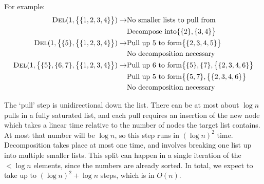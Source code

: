 \documentclass{article}
\begin{document}
\begin{enumerate}
\begin{enumerate}
         For example:
            \begin{equation*}
            \begin{aligned}
                \textsc{Del}(1, \big\{\{1, 2, 3, 4\}\big\}) \rightarrow
                    & \text{No smaller lists to pull from} \\
                    & \text{Decompose into} \{\{2\}, \{3, 4\}\big\} \\
                \textsc{Del}(1, \big\{\{5\}, \big\{\{1, 2, 3, 4\}\big\}) \rightarrow
                    & \text{Pull up 5 to form} \big\{\{2, 3, 4, 5\}\big\} \\
                    & \text{No decomposition necessary} \\
                \textsc{Del}(1, \big\{\{5\}, \{6, 7\}, \big\{\{1, 2, 3, 4\}\big\}) \rightarrow
                    & \text{Pull up 6 to form} \big\{\{5\}, \{7\}, \big\{\{2, 3, 4, 6\}\big\} \\
                    & \text{Pull up 5 to form} \big\{\{5, 7\}, \big\{\{2, 3, 4, 6\}\big\} \\
                    & \text{No decomposition necessary}
            \end{aligned}
            \end{equation*}

        The `pull' step is unidirectional down the list. There can be at most about $\log n$ pulls in a fully saturated list, and each pull requires an insertion of the new node which takes a linear time relative to the number of nodes the target list contains. At most that number will be $\log n$, so this step runs in $(\log n)^2$ time. Decomposition takes place at most one time, and involves breaking one list up into multiple smaller lists. This split can happen in a single iteration of the $< \log n$ elements, since the numbers are already sorted. In total, we expect to take up to $(\log n)^2 + \log n$ steps, which is in $O(n)$.
    \end{enumerate}
\end{enumerate}
\end{document}
